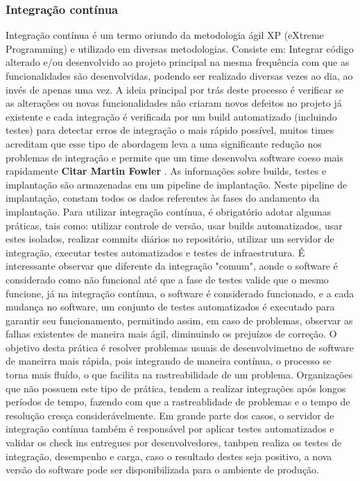 \documentclass[twoside,english,brazilian]{UNISINOSartigo}
\begin{document}
\subsubsection{Integração contínua}
Integração contínua é um termo oriundo da metodologia ágil XP (eXtreme Programming) e utilizado em diversas metodologias. Consiste em: Integrar código alterado e/ou desenvolvido ao projeto principal na mesma frequência com que as funcionalidades são desenvolvidas, podendo ser realizado diversas vezes ao dia, ao invés de apenas uma vez. A ideia principal por trás deste processo é verificar se as alterações ou novas funcionalidades não criaram novos defeitos no projeto já existente e cada integração é verificada por um build automatizado (incluindo testes) para detectar erros de integração o mais rápido possível, muitos times acreditam que esse tipo de abordagem leva a uma significante redução nos problemas de integração e permite que um time desenvolva software coeso mais rapidamente \textbf{Citar Martin Fowler} . As informações sobre builds, testes e implantação são armazenadas em um pipeline de implantação. Neste pipeline de implantação, constam todos os dados referentes às fases do andamento da implantação. Para utilizar integração contínua, é obrigatório adotar algumas práticas, tais como: utilizar controle de versão, usar builds automatizados, usar estes isolados, realizar commits diários no repositório, utilizar um servidor de integração, executar testes automatizados e testes de infraestrutura. É interessante observar que diferente da integração "comum", aonde o software é considerado como não funcional até que a fase de testes valide que o mesmo funcione, já na integração contínua, o software é considerado funcionado, e a cada mudança no software, um conjunto de testes automatizados é executado para garantir seu funcionamento, permitindo assim, em caso de problemas, observar as falhas existentes de maneira mais ágil, diminuindo os prejuízos de correção.  
O objetivo desta prática é resolver problemas usuais de desenvolvimetno de software de maneirra mais rápida, pois integrando de maneira contínua, o processo se torna mais fluído, o que facilita na rastreabilidade de um problema. Organizações que não possuem este tipo de prática, tendem a realizar integrações após longos períodos de tempo, fazendo com que a rastreablidade de problemas e o tempo de resolução cresça considerávelmente. Em grande parte dos casos, o servidor de integração contínua também é responsável por aplicar testes automatizados e validar os check ins entregues por desenvolvedores, tanbpen realiza os testes de integração, desempenho e carga, caso o resultado destes seja positivo, a nova versão do software pode ser disponibilizada para o ambiente de produção.
\end{document}
